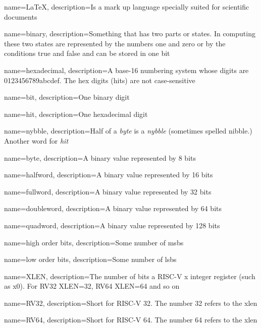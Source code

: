 {
    name=LaTeX,
    description={Is a mark up language specially suited for scientific documents}
}

{
	name=binary,
	description={Something that has two parts or states.  In computing
		these two states are represented by the numbers one and zero or
		by the conditions true and false and can be stored in one \gls{bit}}
}

{
	name=hexadecimal,
	description={A base-16 numbering system whose digits are 0123456789abcdef.
		The hex digits (\gls{hit}s) are not case-sensitive}
}

{
	name=bit,
	description={One binary digit}
}

{
	name={hit},
	description={One \gls{hexadecimal} digit}
}

{
	name={nybble},
	description={Half of a {\em \gls{byte}} is a {\em nybble}
		(sometimes spelled nibble.)  Another word for {\em \gls{hit}}}
}

{
	name=byte,
	description={A \gls{binary} value represented by 8 \gls{bit}s}
}

{
	name={halfword},
	description={A \gls{binary} value represented by 16 \gls{bit}s}
}

{
	name={fullword},
	description={A \gls{binary} value represented by 32 \gls{bit}s}
}

{
	name={doubleword},
	description={A \gls{binary} value represented by 64 \gls{bit}s}
}

{
	name={quadword},
	description={A \gls{binary} value represented by 128 \gls{bit}s}
}

{
	name={high order bits},
	description={Some number of \acrshort{msb}s}
}

{
    name={low order bits},
    description={Some number of \acrshort{lsb}s}
}

{
	name=XLEN,
	description={The number of bits a RISC-V x integer \gls{register}
		(such as x0).  For RV32 XLEN=32, RV64 XLEN=64 and so on}
}

{
	name=RV32,
	description={Short for RISC-V 32.  The number 32 refers to the \gls{xlen}}
}

{
	name=RV64,
	description={Short for RISC-V 64.  The number 64 refers to the \gls{xlen}}
}

